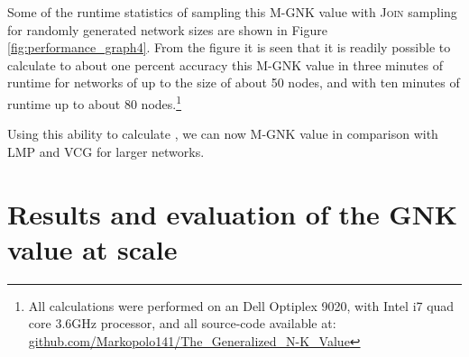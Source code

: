 Some of the runtime statistics of sampling this M-GNK value with \textsc{Join} sampling for randomly generated network sizes \DIFaddbegin {}\DIFaddend are shown in Figure \ref{fig:performance_graph4}.
From the figure it is seen that it is readily possible to calculate to about one percent accuracy this M-GNK value in three minutes of runtime for networks of up to the size of about 50 nodes, and with ten minutes of runtime up to about 80 nodes.\footnote{\label{note1} All calculations were performed on an Dell Optiplex 9020, with Intel i7 quad core 3.6GHz processor, and all source-code available at:\\
\href{https://github.com/Markopolo141/The\_Generalized\_N-K\_Value}{github.com/Markopolo141/The\_Generalized\_N-K\_Value}}

Using this ability to calculate \DIFaddbegin {}\DIFaddend , we can now \DIFdelbegin {}\DIFdelend \DIFaddbegin {}\DIFaddend M-GNK value \DIFdelbegin {}\DIFdelend in comparison with LMP and VCG for larger networks.





\section{Results and evaluation of the GNK value at scale}\label{sec:results_and_evaluation_of_GNK}



